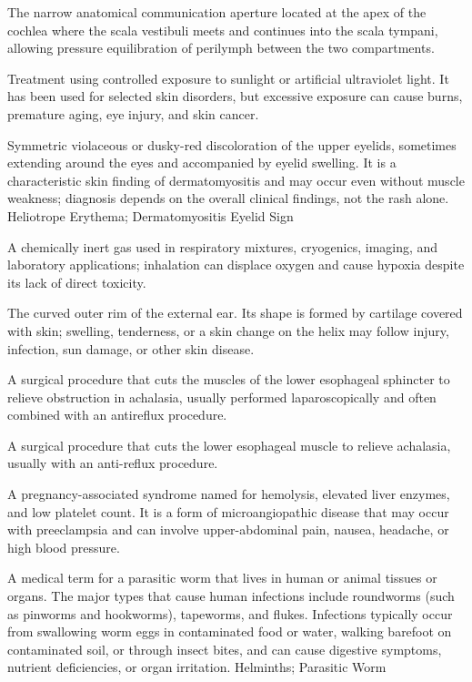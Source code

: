  The narrow anatomical communication aperture located at the apex of the cochlea where the scala vestibuli meets and continues into the scala tympani, allowing pressure equilibration of perilymph between the two compartments.

 Treatment using controlled exposure to sunlight or artificial ultraviolet light. It has been used for selected skin disorders, but excessive exposure can cause burns, premature aging, eye injury, and skin cancer.

 Symmetric violaceous or dusky-red discoloration of the upper
eyelids, sometimes extending around the eyes and accompanied by eyelid swelling. It is a
characteristic skin finding of dermatomyositis and may occur even without muscle weakness;
diagnosis depends on the overall clinical findings, not the rash alone.
\synonyms
Heliotrope Erythema; Dermatomyositis Eyelid Sign

 A chemically inert gas used in respiratory mixtures, cryogenics, imaging, and laboratory applications; inhalation can displace oxygen and cause hypoxia despite its lack of direct toxicity.

 The curved outer rim of the external ear. Its shape is formed by cartilage covered with skin; swelling, tenderness, or a skin change on the helix may follow injury, infection, sun damage, or other skin disease.

 A surgical procedure that cuts the muscles of the lower esophageal sphincter to relieve obstruction in achalasia, usually performed laparoscopically and often combined with an antireflux procedure.

 A surgical procedure that cuts the lower esophageal muscle to relieve achalasia, usually with an anti-reflux procedure.

 A pregnancy-associated syndrome named for hemolysis, elevated liver enzymes, and low platelet count. It is a form of microangiopathic disease that may occur with preeclampsia and can involve upper-abdominal pain, nausea, headache, or high blood pressure.

 A medical term for a parasitic worm that lives in human or animal tissues or organs. The major types that cause human infections include roundworms (such as pinworms and hookworms), tapeworms, and flukes. Infections typically occur from swallowing worm eggs in contaminated food or water, walking barefoot on contaminated soil, or through insect bites, and can cause digestive symptoms, nutrient deficiencies, or organ irritation.
\synonyms
Helminths; Parasitic Worm

